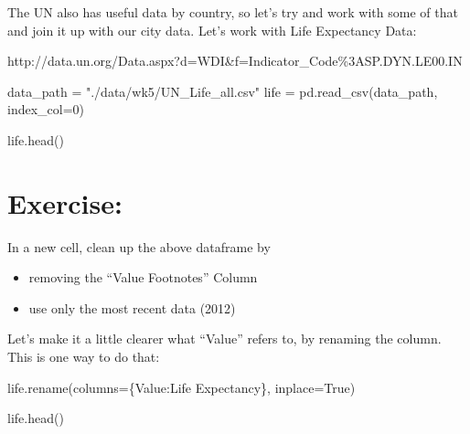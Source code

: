 \documentclass[
  letterpaper,
  DIV=11,
  numbers=noendperiod]{scrreprt}
\newenvironment{Shaded}{\begin{snugshade}}{\end{snugshade}}
\newcommand{\DecValTok}[1]{\textcolor[rgb]{0.68,0.00,0.00}{#1}}
\newcommand{\NormalTok}[1]{\textcolor[rgb]{0.00,0.23,0.31}{#1}}
\newcommand{\OperatorTok}[1]{\textcolor[rgb]{0.37,0.37,0.37}{#1}}
\newcommand{\StringTok}[1]{\textcolor[rgb]{0.13,0.47,0.30}{#1}}
\newcommand{\VariableTok}[1]{\textcolor[rgb]{0.07,0.07,0.07}{#1}}
\providecommand{\tightlist}{%
  \setlength{\itemsep}{0pt}\setlength{\parskip}{0pt}}\usepackage{longtable,booktabs,array}
\begin{document}
The UN also has useful data by country, so let's try and work with some
of that and join it up with our city data. Let's work with Life
Expectancy Data:

http://data.un.org/Data.aspx?d=WDI\&f=Indicator\_Code\%3ASP.DYN.LE00.IN

\begin{Shaded}
\begin{Highlighting}[]
\NormalTok{data\_path }\OperatorTok{=} \StringTok{"./data/wk5/UN\_Life\_all.csv"}
\NormalTok{life }\OperatorTok{=}\NormalTok{ pd.read\_csv(data\_path, index\_col}\OperatorTok{=}\DecValTok{0}\NormalTok{)}
\end{Highlighting}
\end{Shaded}

\begin{Shaded}
\begin{Highlighting}[]
\NormalTok{life.head()}
\end{Highlighting}
\end{Shaded}

\hypertarget{exercise-16}{%
\section{Exercise:}\label{exercise-16}}

In a new cell, clean up the above dataframe by

\begin{itemize}
\tightlist
\item
  removing the ``Value Footnotes'' Column
\item
  use only the most recent data (2012)
\end{itemize}

Let's make it a little clearer what ``Value'' refers to, by renaming the
column. This is one way to do that:

\begin{Shaded}
\begin{Highlighting}[]
\NormalTok{life.rename(columns}\OperatorTok{=}\NormalTok{\{}\StringTok{\textquotesingle{}Value\textquotesingle{}}\NormalTok{:}\StringTok{\textquotesingle{}Life Expectancy\textquotesingle{}}\NormalTok{\}, inplace}\OperatorTok{=}\VariableTok{True}\NormalTok{)}
\end{Highlighting}
\end{Shaded}

\begin{Shaded}
\begin{Highlighting}[]
\NormalTok{life.head()}
\end{Highlighting}
\end{Shaded}
\end{document}

